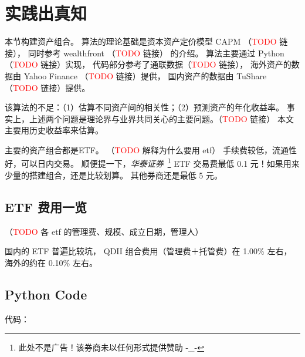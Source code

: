 \documentclass[a4paper, 11pt, UTF8]{report}
\begin{document}
\chapter{实践出真知}

本节构建资产组合。
算法的理论基础是资本资产定价模型 CAPM （\textcolor{red}{TODO} 链接），
同时参考 wealthfront （\textcolor{red}{TODO} 链接） 的介绍。
算法主要通过 Python （\textcolor{red}{TODO} 链接）实现，
代码部分参考了通联数据（\textcolor{red}{TODO} 链接），
海外资产的数据由 Yahoo Finance （\textcolor{red}{TODO} 链接）提供，
国内资产的数据由 TuShare （\textcolor{red}{TODO} 链接）提供。

该算法的不足：（1）估算不同资产间的相关性；（2）预测资产的年化收益率。
事实上，上述两个问题是理论界与业界共同关心的主要问题。（\textcolor{red}{TODO} 链接）
本文主要用历史收益率来估算。

主要的资产组合都是ETF。
（\textcolor{red}{TODO} 解释为什么要用 etf）
手续费较低，流通性好，可以日内交易。
顺便提一下，\emph{华泰证券}~\footnote{此处不是广告！该券商未以任何形式提供赞助 -\_- }
 ETF 交易费最低 0.1 元！如果用来少量的搭建组合，还是比较划算。
其他券商还是最低 5 元。



\section{ETF 费用一览}

（\textcolor{red}{TODO} 各 etf 的管理费、规模、成立日期，管理人）

国内的 ETF 普遍比较坑，
QDII 组合费用（管理费＋托管费）在 1.00\% 左右，
海外的约在 0.10\% 左右。


\section{Python Code}
代码：




\end{document}
